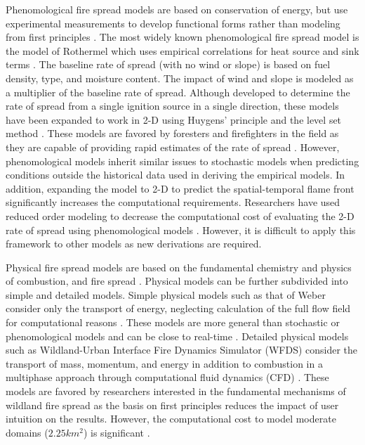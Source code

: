 \documentclass[smallcondensed]{svjour3}     %
\begin{document}
Phenomological fire spread models are based on conservation of
energy, but use experimental measurements to develop functional forms
rather than modeling from first principles \cite{weber1991modelling,sullivan2007b}.
The most widely
known phenomological fire spread model is the model of Rothermel
\cite{rothermel1972mathematical,scott2005standard} which uses
empirical correlations for heat source and sink terms \cite{weber1991modelling}.
The baseline rate of spread (with no wind or slope) is based on fuel density,
type, and moisture content. The impact of wind and slope is modeled as a multiplier
of the baseline rate of spread. Although developed to determine the rate of spread
from a single ignition source in a single direction, these models have been expanded
to work in 2-D using Huygens' principle \cite{finney1999mechanistic,finney1998farsite}
and the level set method \cite{rehm2009fire,lautenberger2013wildland}.
These models are favored by foresters and
firefighters in the field as they are capable of providing rapid estimates
of the rate of spread \cite{simeoni2015wildland}. However, phenomological models
inherit similar issues to stochastic models when predicting conditions
outside the historical data used in deriving the empirical models. In addition,
expanding the model to 2-D to predict the spatial-temporal flame front significantly
increases the computational requirements.
Researchers have used
reduced order modeling to decrease the computational cost of evaluating the
2-D rate of spread using phenomological models \cite{lattimer2016computationally}.
However, it is difficult to apply this framework to other models as new derivations
are required.

Physical fire spread models are based on the fundamental chemistry and physics of
combustion, and fire spread \cite{sullivan2007a}. Physical models can be further 
subdivided into simple and detailed models. Simple physical models such as that of
Weber consider only the transport of energy, neglecting calculation of the full
flow field for computational reasons \cite{weber1991modelling}. These models
are more general than stochastic or phenomological models and can be close to
real-time \cite{simeoni2015wildland}. Detailed physical models such as
Wildland-Urban Interface Fire Dynamics Simulator (WFDS) consider the transport of
mass, momentum, and energy in addition to combustion in a multiphase approach
through computational fluid dynamics (CFD) \cite{mell2007physics}. These models
are favored by researchers interested in the fundamental mechanisms of wildland
fire spread as the basis on first principles reduces the impact of user intuition
on the results. However, the computational cost to model moderate domains
($2.25km^{2}$) is significant \cite{mell2007physics}.
\end{document}
